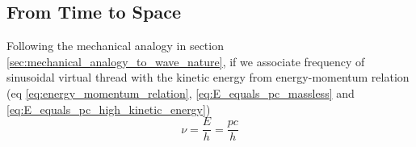 \documentclass[11pt, a4paper]{article}
\newcommand{\eqrefnp}[1]{\textup{\ref{#1}}}  %
\begin{document}
\begin{enumerate}
	\end{enumerate}
	
	\subsection{From Time to Space}
	Following the mechanical analogy in section \ref{sec:mechanical_analogy_to_wave_nature}, if we associate frequency of sinusoidal virtual thread with the kinetic energy from energy-momentum relation (eq \eqrefnp{eq:energy_momentum_relation}, \eqrefnp{eq:E_equals_pc_massless} and \eqrefnp{eq:E_equals_pc_high_kinetic_energy})
	\begin{equation*}
		\nu = \frac{E}{h} = \frac{pc}{h}
	\end{equation*}
	
\end{document}
